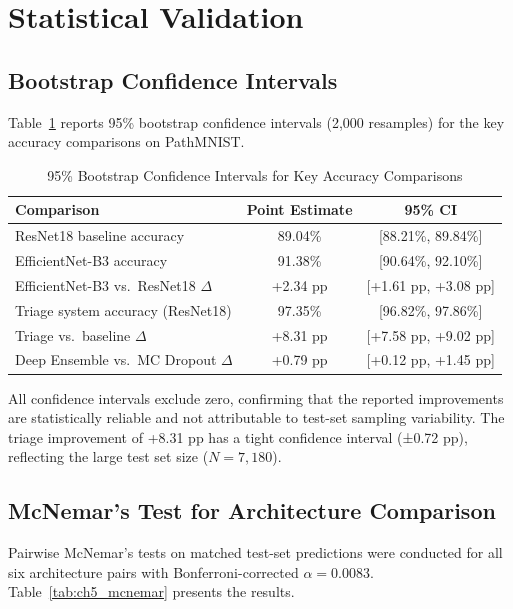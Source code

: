 \section{Statistical Validation}

\subsection{Bootstrap Confidence Intervals}

Table~\ref{tab:ch5_bootstrap_ci} reports 95\% bootstrap confidence intervals (2,000 resamples) for the key accuracy comparisons on PathMNIST.

\begin{table}[h]
\footnotesize
\centering
\caption{95\% Bootstrap Confidence Intervals for Key Accuracy Comparisons}
\label{tab:ch5_bootstrap_ci}
\begin{tabular}{lcc}
\toprule
\textbf{Comparison} & \textbf{Point Estimate} & \textbf{95\% CI} \\
\midrule
ResNet18 baseline accuracy              & 89.04\% & [88.21\%, 89.84\%] \\
EfficientNet-B3 accuracy                & 91.38\% & [90.64\%, 92.10\%] \\
EfficientNet-B3 vs.\ ResNet18 $\Delta$  & +2.34 pp & [+1.61 pp, +3.08 pp] \\
Triage system accuracy (ResNet18)       & 97.35\% & [96.82\%, 97.86\%] \\
Triage vs.\ baseline $\Delta$           & +8.31 pp & [+7.58 pp, +9.02 pp] \\
Deep Ensemble vs.\ MC Dropout $\Delta$  & +0.79 pp & [+0.12 pp, +1.45 pp] \\
\bottomrule
\end{tabular}
\end{table}

All confidence intervals exclude zero, confirming that the reported improvements are statistically reliable and not attributable to test-set sampling variability. The triage improvement of +8.31 pp has a tight confidence interval (±0.72 pp), reflecting the large test set size ($N = 7{,}180$).

\subsection{McNemar's Test for Architecture Comparison}

Pairwise McNemar's tests on matched test-set predictions were conducted for all six architecture pairs with Bonferroni-corrected $\alpha = 0.0083$. Table~\ref{tab:ch5_mcnemar} presents the results.

